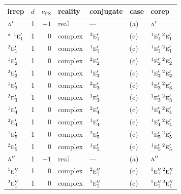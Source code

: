 \documentclass[10pt,a4paper]{article}
\numberwithin{equation}{section}
\newcommand{\irr}[1]{\text{\normalfont\scshape #1}}
\newcommand{\conjpair}[1]{{}^{#1}}
\newcommand{\fsind}{\nu_{\mathrm{FS}}}
\begin{document}
{\small\renewcommand{\arraystretch}{1.25}\setlength{\tabcolsep}{4pt}\begin{longtable}{@{}lrrllll@{}}\toprule
irrep & $d$ & $\fsind$ & reality & conjugate & case & corep\\\midrule\endhead
\bottomrule\endfoot\endlastfoot
$\irr{a}'$ & 1 & $+1$ & real & --- & (a) & $\irr{a}'$\\*
$\conjpair{1}\irr{e}_{1}'$ & 1 & $0$ & complex & $\conjpair{2}\irr{e}_{1}'$ & (c) & $\conjpair{1}\irr{e}_{1}'\,\conjpair{2}\irr{e}_{1}'$\\
$\conjpair{2}\irr{e}_{1}'$ & 1 & $0$ & complex & $\conjpair{1}\irr{e}_{1}'$ & (c) & $\conjpair{1}\irr{e}_{1}'\,\conjpair{2}\irr{e}_{1}'$\\
$\conjpair{1}\irr{e}_{2}'$ & 1 & $0$ & complex & $\conjpair{2}\irr{e}_{2}'$ & (c) & $\conjpair{1}\irr{e}_{2}'\,\conjpair{2}\irr{e}_{2}'$\\
$\conjpair{2}\irr{e}_{2}'$ & 1 & $0$ & complex & $\conjpair{1}\irr{e}_{2}'$ & (c) & $\conjpair{1}\irr{e}_{2}'\,\conjpair{2}\irr{e}_{2}'$\\
$\conjpair{1}\irr{e}_{3}'$ & 1 & $0$ & complex & $\conjpair{2}\irr{e}_{3}'$ & (c) & $\conjpair{1}\irr{e}_{3}'\,\conjpair{2}\irr{e}_{3}'$\\
$\conjpair{2}\irr{e}_{3}'$ & 1 & $0$ & complex & $\conjpair{1}\irr{e}_{3}'$ & (c) & $\conjpair{1}\irr{e}_{3}'\,\conjpair{2}\irr{e}_{3}'$\\
$\conjpair{1}\irr{e}_{4}'$ & 1 & $0$ & complex & $\conjpair{2}\irr{e}_{4}'$ & (c) & $\conjpair{1}\irr{e}_{4}'\,\conjpair{2}\irr{e}_{4}'$\\
$\conjpair{2}\irr{e}_{4}'$ & 1 & $0$ & complex & $\conjpair{1}\irr{e}_{4}'$ & (c) & $\conjpair{1}\irr{e}_{4}'\,\conjpair{2}\irr{e}_{4}'$\\
$\conjpair{1}\irr{e}_{5}'$ & 1 & $0$ & complex & $\conjpair{2}\irr{e}_{5}'$ & (c) & $\conjpair{1}\irr{e}_{5}'\,\conjpair{2}\irr{e}_{5}'$\\
$\conjpair{2}\irr{e}_{5}'$ & 1 & $0$ & complex & $\conjpair{1}\irr{e}_{5}'$ & (c) & $\conjpair{1}\irr{e}_{5}'\,\conjpair{2}\irr{e}_{5}'$\\
$\irr{a}''$ & 1 & $+1$ & real & --- & (a) & $\irr{a}''$\\
$\conjpair{1}\irr{e}_{1}''$ & 1 & $0$ & complex & $\conjpair{2}\irr{e}_{1}''$ & (c) & $\conjpair{1}\irr{e}_{1}''\,\conjpair{2}\irr{e}_{1}''$\\
$\conjpair{2}\irr{e}_{1}''$ & 1 & $0$ & complex & $\conjpair{1}\irr{e}_{1}''$ & (c) & $\conjpair{1}\irr{e}_{1}''\,\conjpair{2}\irr{e}_{1}''$\\

\end{longtable}}
\end{document}
